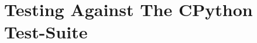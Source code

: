 \documentclass{l4proj}
\begin{document}
\section{Testing Against The CPython Test-Suite}







\end{document}
